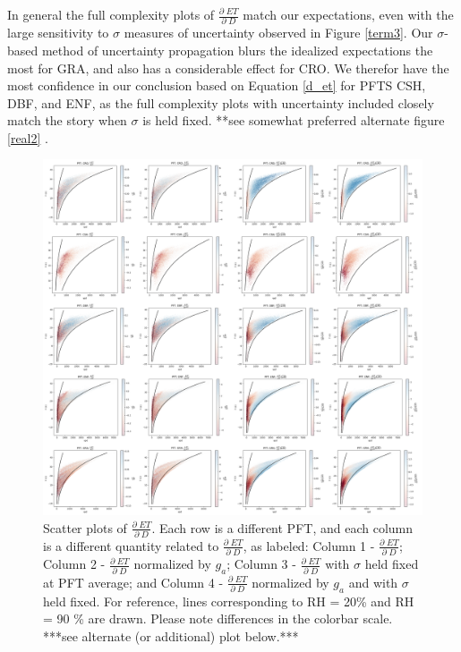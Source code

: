 \documentclass[draft,linenumbers]{agujournal}
\begin{document}
In general the full complexity plots of $\frac{\partial \; ET}{\partial \; D}$ match our expectations, even with the large sensitivity to $\sigma$ measures of uncertainty observed in Figure \ref{term3}. Our $\sigma$-based method of uncertainty propagation blurs the idealized expectations the most for GRA, and also has a considerable effect for CRO. We therefor have the most confidence in our conclusion based on Equation \ref{d_et} for PFTS CSH, DBF, and ENF, as the full complexity plots with uncertainty included closely match the story when $\sigma$ is held fixed. **see somewhat preferred alternate figure \ref{real2} .
\begin{figure}[h]
\centering
\includegraphics[width=\textwidth]{./fig06.png}
\caption{Scatter plots of $\frac{\partial \; ET}{\partial \; D}$. Each row is a different PFT, and each column is a different quantity related to $\frac{\partial \; ET}{\partial \; D}$, as labeled: Column 1 - $\frac{\partial \; ET}{\partial \; D}$; Column 2 - $\frac{\partial \; ET}{\partial \; D}$ normalized by $g_a$; Column 3 - $\frac{\partial \; ET}{\partial \; D}$ with $\sigma$ held fixed at PFT average; and Column 4 - $\frac{\partial \; ET}{\partial \; D}$ normalized by $g_a$ and with $\sigma$ held fixed. For reference, lines corresponding to RH = 20\% and RH = 90 \% are drawn. Please note differences in the colorbar scale. ***see alternate (or additional) plot below.***}
\label{real}
\end{figure}
\end{document}
